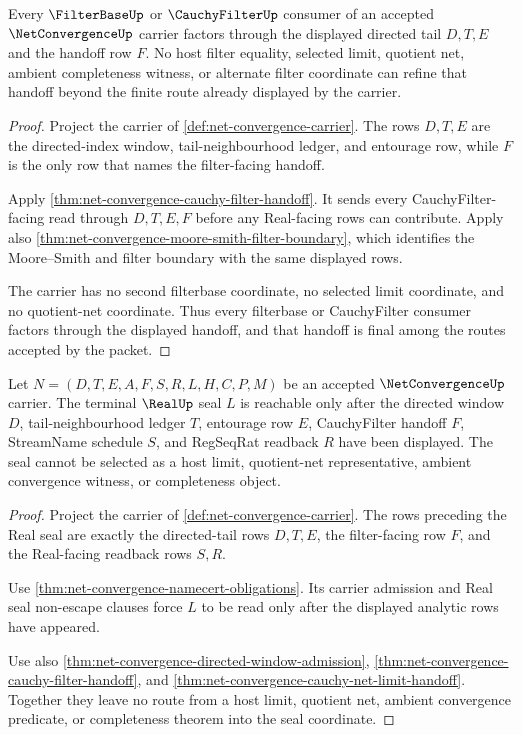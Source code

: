 \begin{theorem}
\label{thm:net-convergence-filterbase-finality}
Every $\FilterBaseUp$ or $\CauchyFilterUp$ consumer of an accepted $\NetConvergenceUp$ carrier factors through the displayed directed tail $D,T,E$ and the handoff row $F$. No host filter equality, selected limit, quotient net, ambient completeness witness, or alternate filter coordinate can refine that handoff beyond the finite route already displayed by the carrier.
\end{theorem}
\begin{proof}
Project the carrier of \autoref{def:net-convergence-carrier}. The rows $D,T,E$ are the directed-index window, tail-neighbourhood ledger, and entourage row, while $F$ is the only row that names the filter-facing handoff.

Apply \autoref{thm:net-convergence-cauchy-filter-handoff}. It sends every CauchyFilter-facing read through $D,T,E,F$ before any Real-facing rows can contribute. Apply also \autoref{thm:net-convergence-moore-smith-filter-boundary}, which identifies the Moore--Smith and filter boundary with the same displayed rows.

The carrier has no second filterbase coordinate, no selected limit coordinate, and no quotient-net coordinate. Thus every filterbase or CauchyFilter consumer factors through the displayed handoff, and that handoff is final among the routes accepted by the packet.
\end{proof}

\begin{theorem}
\label{thm:net-convergence-real-seal-nonescape}
Let $N=(D,T,E,A,F,S,R,L,H,C,P,M)$ be an accepted $\NetConvergenceUp$ carrier. The terminal $\RealUp$ seal $L$ is reachable only after the directed window $D$, tail-neighbourhood ledger $T$, entourage row $E$, CauchyFilter handoff $F$, StreamName schedule $S$, and RegSeqRat readback $R$ have been displayed. The seal cannot be selected as a host limit, quotient-net representative, ambient convergence witness, or completeness object.
\end{theorem}
\begin{proof}
Project the carrier of \autoref{def:net-convergence-carrier}. The rows preceding the Real seal are exactly the directed-tail rows $D,T,E$, the filter-facing row $F$, and the Real-facing readback rows $S,R$.

Use \autoref{thm:net-convergence-namecert-obligations}. Its carrier admission and Real seal non-escape clauses force $L$ to be read only after the displayed analytic rows have appeared.

Use also \autoref{thm:net-convergence-directed-window-admission}, \autoref{thm:net-convergence-cauchy-filter-handoff}, and \autoref{thm:net-convergence-cauchy-net-limit-handoff}. Together they leave no route from a host limit, quotient net, ambient convergence predicate, or completeness theorem into the seal coordinate.
\end{proof}

